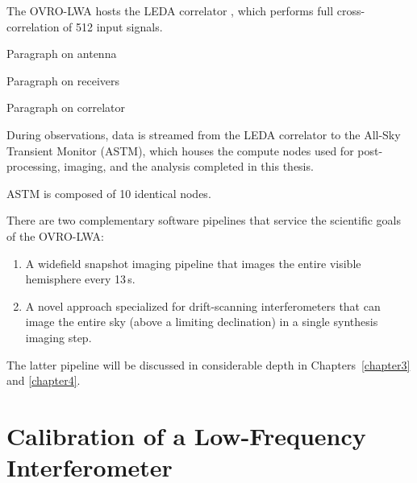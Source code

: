 \begin{bibunit}
The OVRO-LWA hosts the LEDA correlator \citep{2015JAI.....450003K}, which performs full
cross-correlation of 512 input signals.

Paragraph on antenna

Paragraph on receivers

Paragraph on correlator


During observations, data is streamed from the LEDA correlator to the All-Sky Transient Monitor
(ASTM), which houses the compute nodes used for post-processing, imaging, and the analysis completed
in this thesis.

ASTM is composed of 10 identical nodes.


There are two complementary software pipelines that service the scientific goals of the OVRO-LWA:
\begin{enumerate}
    \item A widefield snapshot imaging pipeline that images the entire visible hemisphere every
        13\,s.
    \item A novel approach specialized for drift-scanning interferometers that can image the entire
        sky (above a limiting declination) in a single synthesis imaging step.
\end{enumerate}
The latter pipeline will be discussed in considerable depth in Chapters~\ref{chapter3} and
\ref{chapter4}.

\section{Calibration of a Low-Frequency Interferometer}


\end{bibunit}
